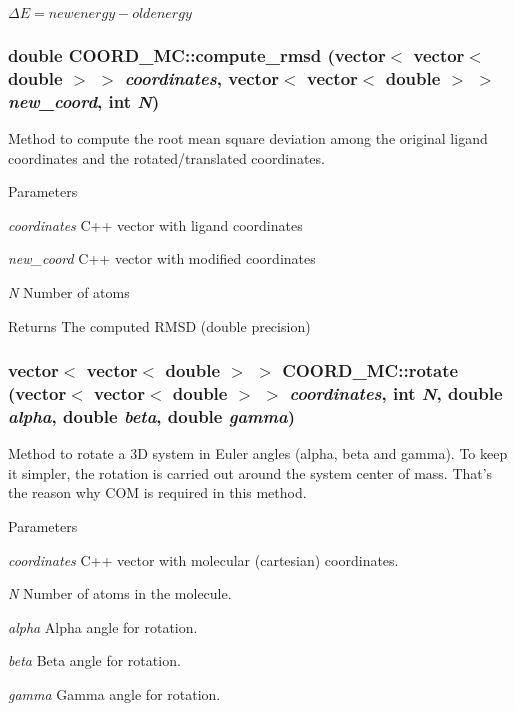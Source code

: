 $ \Delta E = new energy - old energy $ \hypertarget{classCOORD__MC_a3e94bd18aedf819364703921c9ce7a35}{
\subsubsection[{compute\_\-rmsd}]{\setlength{\rightskip}{0pt plus 5cm}double COORD\_\-MC::compute\_\-rmsd (vector$<$ vector$<$ double $>$ $>$ {\em coordinates}, \/  vector$<$ vector$<$ double $>$ $>$ {\em new\_\-coord}, \/  int {\em N})}}
\label{classCOORD__MC_a3e94bd18aedf819364703921c9ce7a35}
Method to compute the root mean square deviation among the original ligand coordinates and the rotated/translated coordinates. 
\begin{DoxyParams}{Parameters}
\item[{\em coordinates}]C++ vector with ligand coordinates \item[{\em new\_\-coord}]C++ vector with modified coordinates \item[{\em N}]Number of atoms \end{DoxyParams}
\begin{DoxyReturn}{Returns}
The computed RMSD (double precision) 
\end{DoxyReturn}
\hypertarget{classCOORD__MC_a79d104dc9fd9c0d6b52387c01cbac576}{
\subsubsection[{rotate}]{\setlength{\rightskip}{0pt plus 5cm}vector$<$ vector$<$ double $>$ $>$ COORD\_\-MC::rotate (vector$<$ vector$<$ double $>$ $>$ {\em coordinates}, \/  int {\em N}, \/  double {\em alpha}, \/  double {\em beta}, \/  double {\em gamma})}}
\label{classCOORD__MC_a79d104dc9fd9c0d6b52387c01cbac576}
Method to rotate a 3D system in Euler angles (alpha, beta and gamma). To keep it simpler, the rotation is carried out around the system center of mass. That's the reason why COM is required in this method. 
\begin{DoxyParams}{Parameters}
\item[{\em coordinates}]C++ vector with molecular (cartesian) coordinates. \item[{\em N}]Number of atoms in the molecule. \item[{\em alpha}]Alpha angle for rotation. \item[{\em beta}]Beta angle for rotation. \item[{\em gamma}]Gamma angle for rotation. \end{DoxyParams}
